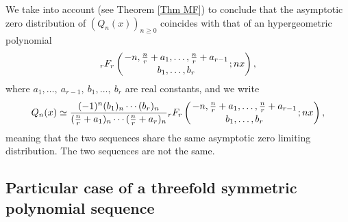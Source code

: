 \documentclass[12pt]{article}
\numberwithin{equation}{section}
\newcommand{\pFq}[5]{{}_{#1}F_{#2} \left( \genfrac{}{}{0pt}{}{#3}{#4}; #5 \right)  }
\begin{document}
We take into account \cite[Theorem 3.9 ]{MF-MP2} (see Theorem \ref{Thm MF}) to conclude that the asymptotic zero distribution of $(Q_n(x))_{n\geq0}$ coincides with that of an hypergeometric polynomial 
\[\pFq{r}{r}{-n,\frac{n}{r}+a_1,\ldots,\frac{n}{r}+a_{r-1}}{b_1,\ldots, b_r}{nx},  \]
where \(a_1,\ldots,\ a_{r-1} ,\ b_1, \ldots ,\  b_r\) are real constants, and we write 
\[   	Q_n(x) \simeq \frac{(-1)^n(b_1)_n\cdots (b_r)_n}{(\frac{n}{r}+a_1)_n\cdots (\frac{n}{r}+a_r)_n} \pFq{r}{r}{-n,\frac{n}{r}+a_1,\ldots,\frac{n}{r}+a_{r-1}}{b_1,\ldots, b_r}{nx},  \]
meaning that the two sequences share the same asymptotic zero limiting distribution. The two sequences are not the same. 

 


\subsection*{Particular case of  a threefold symmetric polynomial sequence} 
\end{document}
